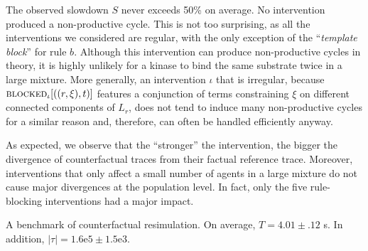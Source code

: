 The observed slowdown $S$ never exceeds 50\% on average. No intervention
produced a non-productive cycle. This is not too surprising, as all the
interventions we considered are regular, with the only exception of the
``\textit{template block}'' for rule $b$. Although this intervention can produce
non-productive cycles in theory, it is highly unlikely for a kinase to bind the same substrate twice in a large mixture. More
generally, an intervention $\iota$ that is irregular, because
${\textsc{blocked}}_{\iota}[((r, \xi), t)]$ features a conjunction of terms constraining
$\xi$ on different connected components of $L_r$, does not tend to induce many
non-productive cycles for a similar reason and, therefore, can often be handled
efficiently anyway.

As expected, we observe that the ``stronger'' the intervention, the bigger the divergence of counterfactual traces from their factual reference trace. Moreover, interventions that only affect a small number of
agents in a large mixture do not cause major divergences at the population level. In fact, only the five rule-blocking interventions had a major impact.



 \begin{table}\footnotesize
  \begin{center}
    
  \end{center}
  \caption{
A benchmark of counterfactual resimulation. On average,
    $T = 4.01\pm .12$ s.  In addition,
    $|\tau| = 1.6\mathrm{e}5 \pm 1.5\mathrm{e}3$.}\label{tab:bench}
\end{table}
